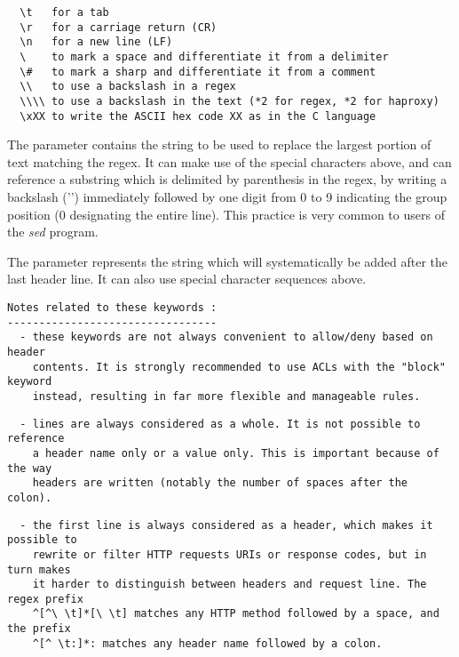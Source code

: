 \begin{verbatim}
  \t   for a tab
  \r   for a carriage return (CR)
  \n   for a new line (LF)
  \    to mark a space and differentiate it from a delimiter
  \#   to mark a sharp and differentiate it from a comment
  \\   to use a backslash in a regex
  \\\\ to use a backslash in the text (*2 for regex, *2 for haproxy)
  \xXX to write the ASCII hex code XX as in the C language
\end{verbatim}


The  parameter contains the string to be used to replace the largest
portion of text matching the regex. It can make use of the special characters
above, and can reference a substring which is delimited by parenthesis in the
regex, by writing a backslash ('\bslash ') immediately followed by one digit from 0 to
9 indicating the group position (0 designating the entire line). This practice
is very common to users of the \emph{sed} program.


The  parameter represents the string which will systematically be added
after the last header line. It can also use special character sequences above.

\begin{verbatim}
Notes related to these keywords :
---------------------------------
  - these keywords are not always convenient to allow/deny based on header
    contents. It is strongly recommended to use ACLs with the "block" keyword
    instead, resulting in far more flexible and manageable rules.
\end{verbatim}

\begin{verbatim}
  - lines are always considered as a whole. It is not possible to reference
    a header name only or a value only. This is important because of the way
    headers are written (notably the number of spaces after the colon).
\end{verbatim}

\begin{verbatim}
  - the first line is always considered as a header, which makes it possible to
    rewrite or filter HTTP requests URIs or response codes, but in turn makes
    it harder to distinguish between headers and request line. The regex prefix
    ^[^\ \t]*[\ \t] matches any HTTP method followed by a space, and the prefix
    ^[^ \t:]*: matches any header name followed by a colon.
\end{verbatim}


